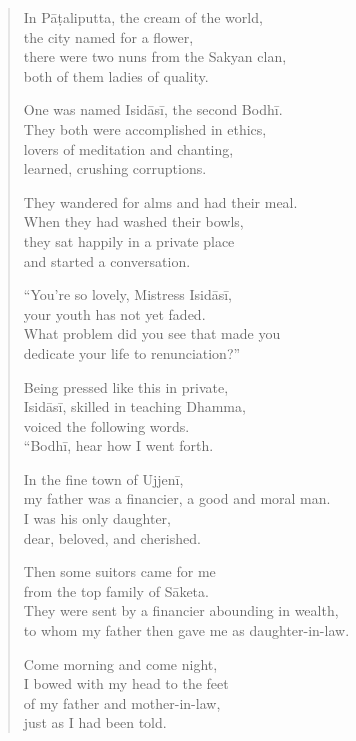 \documentclass[12pt,openany]{book}%
\begin{document}
\begin{verse}%
In \textsanskrit{Pāṭaliputta}, the cream of the world, \\
the city named for a flower, \\
there were two nuns from the Sakyan clan, \\
both of them ladies of quality. 

One was named \textsanskrit{Isidāsī}, the second \textsanskrit{Bodhī}. \\
They both were accomplished in ethics, \\
lovers of meditation and chanting, \\
learned, crushing corruptions. 

They wandered for alms and had their meal. \\
When they had washed their bowls, \\
they sat happily in a private place \\
and started a conversation. 

“You’re so lovely, Mistress \textsanskrit{Isidāsī}, \\
your youth has not yet faded. \\
What problem did you see that made you \\
dedicate your life to renunciation?” 

Being pressed like this in private, \\
\textsanskrit{Isidāsī}, skilled in teaching Dhamma, \\
voiced the following words. \\
“\textsanskrit{Bodhī}, hear how I went forth. 

In the fine town of \textsanskrit{Ujjenī}, \\
my father was a financier, a good and moral man. \\
I was his only daughter, \\
dear, beloved, and cherished. 

Then some suitors came for me \\
from the top family of \textsanskrit{Sāketa}. \\
They were sent by a financier abounding in wealth, \\
to whom my father then gave me as daughter-in-law. 

Come morning and come night, \\
I bowed with my head to the feet \\
of my father and mother-in-law, \\
just as I had been told. 


\end{verse}
\end{document}
